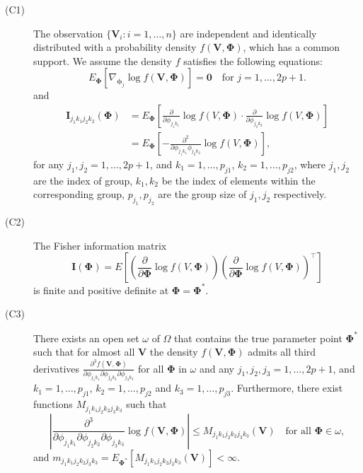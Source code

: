\documentclass[a4paper,fleqn]{cas-sc}
\newcommand{\ddd}{,\ldots,}
\begin{document}
\begin{description}
	\item [{(C1)}] The observation $\{\mathbf{V}_{i}:i=1\ddd n\}$ are independent
	and identically distributed with a probability density $f(\mathbf{V},\boldsymbol{\Phi})$,
	which has a common support. We assume the density $f$ satisfies the
	following equations:
	\[
	E_{\boldsymbol{\Phi}}\left[\nabla_{\boldsymbol{\phi}_{j}}\log f\left(\boldsymbol{V},\boldsymbol{\Phi}\right)\right]=\mathbf{0}\quad\text{for }j=1\ddd2p+1.
	\]
	and 
	\begin{align*}
	\mathbf{I}_{j_{1}k_{1}j_{2}k_{2}}(\boldsymbol{\Phi}) & =E_{\boldsymbol{\Phi}}\left[\frac{\partial}{\partial\phi_{j_{1}k_{1}}}\log f(V,\boldsymbol{\Phi})\cdot\frac{\partial}{\partial\phi_{j_{2}k_{2}}}\log f(V,\boldsymbol{\Phi})\right]\\
	& =E_{\boldsymbol{\Phi}}\left[-\frac{\partial^{2}}{\partial\phi_{j_{1}k_{1}}\phi_{j_{2}k_{2}}}\log f(V,\boldsymbol{\Phi})\right],
	\end{align*}
	for any $j_{1},j_{2}=1\ddd2p+1$, and $k_{1}=1\ddd p_{j1}$, $k_{2}=1\ddd p_{j2}$,
	where $j_{1},j_{2}$ are the index of group, $k_{1},k_{2}$ be the
	index of elements within the corresponding group, $p_{j_{1}},p_{j_{2}}$
	are the group size of $j_{1},j_{2}$ respectively.
	\item [{(C2)}] The Fisher information matrix 
	\[
	\mathbf{I}\left(\boldsymbol{\Phi}\right)=E\left[\left(\frac{\partial}{\partial\boldsymbol{\Phi}}\log f(V,\boldsymbol{\Phi})\right)\left(\frac{\partial}{\partial\boldsymbol{\Phi}}\log f(V,\boldsymbol{\Phi})\right)^{\top}\right]
	\]
	is finite and positive definite at $\boldsymbol{\Phi}=\boldsymbol{\Phi}^{*}$.
	\item [{(C3)}] There exists an open set $\omega$ of $\Omega$ that contains
	the true parameter point $\boldsymbol{\Phi}^{*}$ such that for almost
	all $\mathbf{V}$ the density $f(\mathbf{V},\boldsymbol{\Phi})$ admits
	all third derivatives $\frac{\partial^{3}f(\mathbf{V},\boldsymbol{\Phi})}{\partial\phi_{j_{1}k_{1}}\partial\phi_{j_{2}k_{2}}\partial\phi_{j_{3}k_{3}}}$
	for all $\boldsymbol{\Phi}$ in $\omega$ and any $j_{1},j_{2},j_{3}=1\ddd2p+1$,
	and $k_{1}=1\ddd p_{j1}$, $k_{2}=1\ddd p_{j2}$ and $k_{3}=1\ddd p_{j3}$.
	Furthermore, there exist functions $M_{j_{1}k_{1}j_{2}k_{2}j_{3}k_{3}}$
	such that
	\[
	\left|\frac{\partial^{3}}{\partial\phi_{j_{1}k_{1}}\partial\phi_{j_{2}k_{2}}\partial\phi_{j_{3}k_{3}}}\log f(\mathbf{V},\boldsymbol{\Phi})\right|\leq M_{j_{1}k_{1}j_{2}k_{2}j_{3}k_{3}}(\mathbf{V})\quad\text{for all }\boldsymbol{\Phi}\in\omega,
	\]
	and $m_{j_{1}k_{1}j_{2}k_{2}j_{3}k_{3}}=E_{\boldsymbol{\Phi}^{*}}[M_{j_{1}k_{1}j_{2}k_{2}j_{3}k_{3}}(\mathbf{V})]<\infty$.
\end{description}
\end{document}
